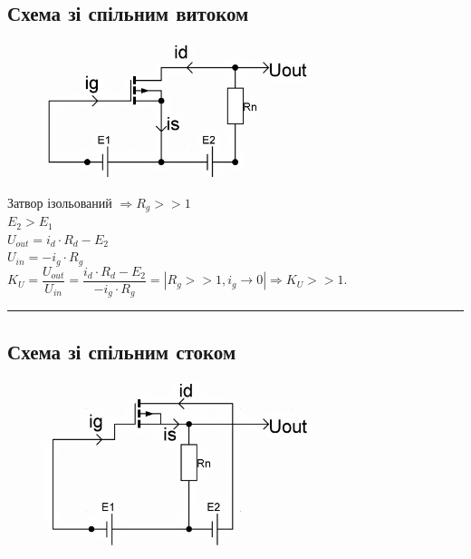 \documentclass[14pt,a4paper]{scrartcl}
\begin{document}
 \subsection{Схема зі спільним витоком}
\begin{figure}[!h]\TopFloatBoxes\CenterFloatBoxes
{}
{\includegraphics[width=0.7\textwidth]{comsource}}
 \end{figure}

\begin{center}
Затвор ізольований $\Rightarrow R_g>>1$\\[0.5cm]

$E_2>E_1$\\[0.5cm]

$U_{out}=i_d\cdot{R_d}-E_2$\\[0.5cm]

$U_{in}=-i_g\cdot{R_g}$\\[0.5cm]

$K_U=\dfrac{U_{out}}{U_{in}}=\dfrac{i_d\cdot{R_d}-E_2}{-i_g\cdot{R_g}}=\left|R_g>>1, i_g\rightarrow 0\right|\Rightarrow\boxed{K_U>>1}$.
\end{center}
\medskip\hrule\medskip
\newpage

\subsection{Схема зі спільним стоком}
\begin{figure}[!h]\TopFloatBoxes\CenterFloatBoxes
{}
{\includegraphics[width=0.7\textwidth]{comdrain}}
 \end{figure}
\end{document}

